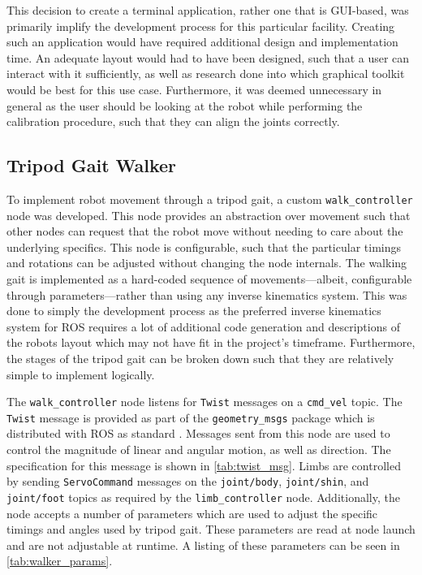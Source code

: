 This decision to create a terminal application, rather one that is GUI-based, was primarily  implify the development process for this particular facility. Creating such an application would have required additional design and implementation time. An adequate layout would had to have been designed, such that a user can interact with it sufficiently, as well as research done into which graphical toolkit would be best for this use case. Furthermore, it was deemed unnecessary in general as the user should be looking at the robot while performing the calibration procedure, such that they can align the joints correctly.

\subsection{Tripod Gait Walker}

To implement robot movement through a tripod gait, a custom \texttt{walk\_controller} node was developed. This node provides an abstraction over movement such that other nodes can request that the robot move without needing to care about the underlying specifics. This node is configurable, such that the particular timings and rotations can be adjusted without changing the node internals. The walking gait is implemented as a hard-coded sequence of movements---albeit, configurable through parameters---rather than using any inverse kinematics system. This was done to simply the development process as the preferred inverse kinematics system for ROS requires a lot of additional code generation and descriptions of the robots layout which may not have fit in the project's timeframe. Furthermore, the stages of the tripod gait can be broken down such that they are relatively simple to implement logically.

The \texttt{walk\_controller} node listens for \texttt{Twist} messages on a \texttt{cmd\_vel} topic. The \texttt{Twist} message is provided as part of the \texttt{geometry\_msgs} package which is distributed with ROS as standard \cite{ros_api_twist_msg}. Messages sent from this node are used to control the magnitude of linear and angular motion, as well as direction. The specification for this message is shown in \autoref{tab:twist_msg}. Limbs are controlled by sending \texttt{ServoCommand} messages on the \texttt{joint/body}, \texttt{joint/shin}, and \texttt{joint/foot} topics as required by the \texttt{limb\_controller} node. Additionally, the node accepts a number of parameters which are used to adjust the specific timings and angles used by tripod gait. These parameters are read at node launch and are not adjustable at runtime. A listing of these parameters can be seen in \autoref{tab:walker_params}.

